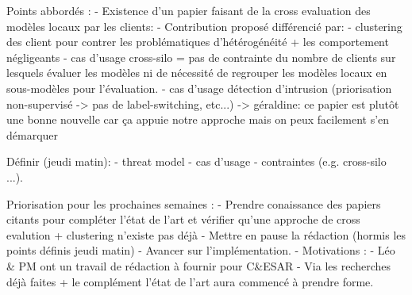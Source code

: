 Points abbordés : 
- Existence d'un papier faisant de la cross evaluation des modèles locaux par les clients:  
    - Contribution proposé différencié par:
      - clustering des client pour contrer les problématiques d'hétérogénéité + les comportement négligeants
      - cas d'usage cross-silo = pas de contrainte du nombre de clients sur lesquels évaluer les modèles ni de nécessité de regrouper les modèles locaux en sous-modèles pour l'évaluation.
      - cas d'usage détection d'intrusion (priorisation non-supervisé -> pas de label-switching, etc...)
    -> géraldine: ce papier est plutôt une bonne nouvelle car ça appuie notre approche mais on peux facilement s'en démarquer
    

Définir (jeudi matin): 
- threat model 
- cas d'usage 
- contraintes (e.g. cross-silo ...).

Priorisation pour les prochaines semaines : 
- Prendre conaissance des papiers citants \cite{zhao_shielding_2020} pour compléter l'état de l'art et vérifier qu'une approche de cross evalution + clustering n'existe pas déjà
- Mettre en pause la rédaction (hormis les points définis jeudi matin) 
- Avancer sur l'implémentation. 
    - Motivations : 
        - Léo & PM ont un travail de rédaction à fournir pour C&ESAR
        - Via les recherches déjà faites + le complément l'état de l'art aura commencé à prendre forme. 
    
